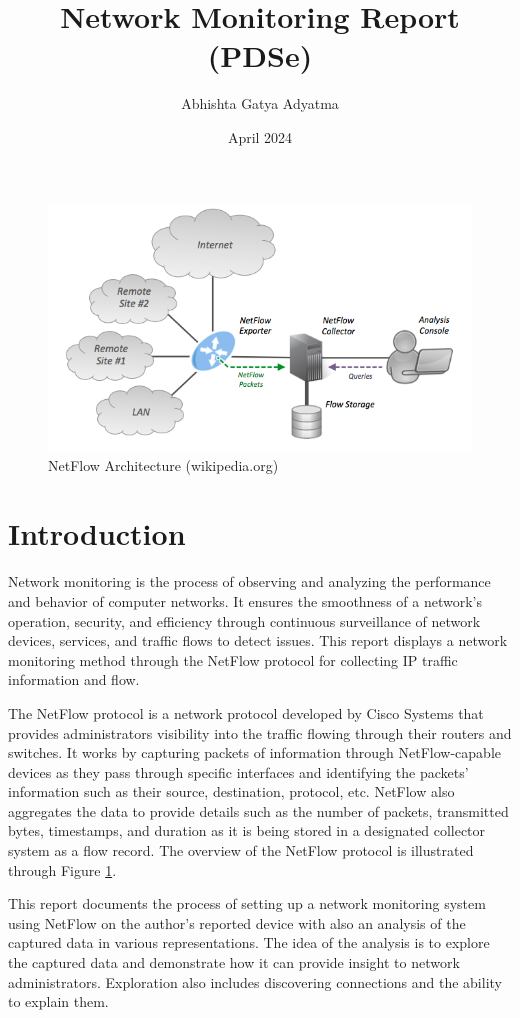 \documentclass{article}
\title{Network Monitoring Report (PDSe)}
\author{Abhishta Gatya Adyatma}
\date{April 2024}
\begin{document}
\maketitle

\begin{figure}[htbp]
    \centering
    \includegraphics[width=0.6\linewidth]{img/NetFlow_Architecture_2012.png}
    \caption{NetFlow Architecture (wikipedia.org)}
    \label{fig:nfarch}
\end{figure}

\section{Introduction}

Network monitoring is the process of observing and analyzing the performance and behavior of computer networks. It ensures the smoothness of a network's operation, security, and efficiency through continuous surveillance of network devices, services, and traffic flows to detect issues. This report displays a network monitoring method through the NetFlow protocol for collecting IP traffic information and flow.

The NetFlow protocol is a network protocol developed by Cisco Systems that provides administrators visibility into the traffic flowing through their routers and switches. It works by capturing packets of information through NetFlow-capable devices as they pass through specific interfaces and identifying the packets' information such as their source, destination, protocol, etc. NetFlow also aggregates the data to provide details such as the number of packets, transmitted bytes, timestamps, and duration as it is being stored in a designated collector system as a flow record. The overview of the NetFlow protocol is illustrated through Figure \ref{fig:nfarch}.

This report documents the process of setting up a network monitoring system using NetFlow on the author's reported device with also an analysis of the captured data in various representations. The idea of the analysis is to explore the captured data and demonstrate how it can provide insight to network administrators. Exploration also includes discovering connections and the ability to explain them.
\end{document}
